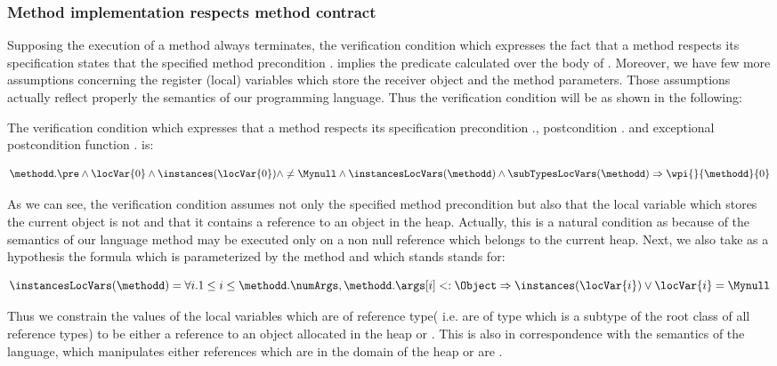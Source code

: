 \subsubsection{Method implementation respects method contract}
Supposing the execution of a method always terminates, the verification condition which expresses the fact that 
 a method \methodd{}  respects its specification 
states that the specified method precondition  \methodd.\pre{} implies the
 predicate   calculated over the body of
 \methodd{}. Moreover,  we have few more assumptions concerning the register (local) variables
 which store the receiver object and the method parameters. Those assumptions
 actually reflect properly the semantics of our programming language. Thus the
 verification condition  will be as shown in the following: %
\begin{thmVC}\label{wp:vc:impl}The verification condition which expresses that a method \methodd{}
  respects its specification precondition \methodd.\pre{}, postcondition
  \methodd.\normalPost{} and exceptional postcondition function   \methodd.\excPostSpec{} is:

 $$ \methodd.\pre  \wedge \locVar{0} \wedge \instances( \locVar{0} ) \wedge
\neq \Mynull   
\wedge \instancesLocVars(\methodd )  \wedge \subTypesLocVars(\methodd )   \Rightarrow
 \wpi{}{\methodd}{0} $$
\end{thmVC}
As we can see, the verification condition assumes not only the specified
 method precondition but also  that the local variable
 which stores the current object is not \Mynull{} and that it
 contains a reference to an object in the heap. Actually, this is
 a natural condition as because of the semantics of our language
 method may be executed only on a non null reference which belongs to the
 current heap. Next, we also take as  a hypothesis the formula  \instancesLocVars{} which is
parameterized by the method \methodd{} and   which stands stands for:

$$ \instancesLocVars(\methodd  )  =  \forall i.
 1 \le i \le \methodd.\numArgs,  \methodd. \args[i] <: \Object \Rightarrow  \instances( \locVar{i} )
  \vee \locVar{i} = \Mynull
$$

Thus we constrain the values of the local variables which are of reference
type( i.e. are of type which is a subtype  of the root class \Object{} of all
reference types) to be either a reference to an object allocated in the
heap or \Mynull. This is also in correspondence with the semantics of the
language, which manipulates either references which are in the domain
of the heap or are \Mynull.

